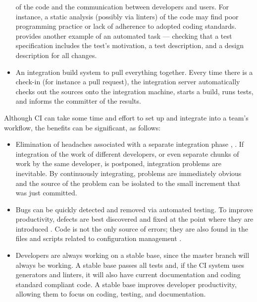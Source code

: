 \documentclass[final, 3p, times, authoryear]{elsarticle}
\begin{document}
\begin{itemize}
	of the code and the communication between developers and users. For
	instance, a static analysis (possibly via linters) of the code may find poor
	programming practice or lack of adherence to adopted coding standards.
	\citet{SlaughterEtAl2021} provides another example of an automated task ---
	checking that a test specification includes the test's motivation, a test
	description, and a design description for all changes. 
	\item An integration build system to pull everything together.  Every time
	there is a check-in (for instance a pull request), the integration server
	automatically checks out the sources onto the integration machine, starts a
	build, runs tests, and informs the committer of the results. 
\end{itemize}

Although CI can take some time and effort to set up and integrate into a team's
workflow, the benefits can be significant, as follows:

\begin{itemize}
	\item Elimination of headaches associated with a separate integration phase
	\citep{Fowler2006}, \citep[p.\ 20]{HumbleAndFarley2010}. If integration of
	the work of different developers, or even separate chunks of work by the
	same developer, is postponed, integration problems are inevitable.  By
	continuously integrating, problems are immediately obvious and the source of
	the problem can be isolated to the small increment that was just committed.
	\item Bugs can be quickly detected and removed \citep{Fowler2006} via
	automated testing.  To improve productivity, defects are best discovered and
	fixed at the point where they are introduced \citep[p.\
	23]{HumbleAndFarley2010}.  Code is not the only source of errors; they are
	also found in the files and scripts related to configuration management
	\citep[p.\ 18]{HumbleAndFarley2010}.
	\item Developers are always working on a stable base, since the master
	branch will always be working.  A stable base passes all tests and, if the
	CI system uses generators and linters, it will also have current
	documentation and coding standard compliant code.  A stable base improves
	developer productivity, allowing them to focus on coding, testing, and
	documentation.
\end{itemize}
\end{document}
